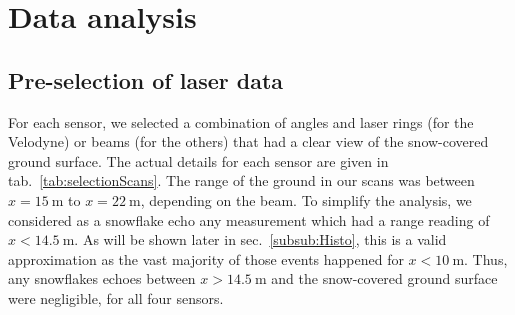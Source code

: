 \section{Data analysis}
\label{sec:data-analysis}



\subsection{Pre-selection of laser data}
For each sensor, we selected a combination of angles and laser rings (for the Velodyne) or beams (for the others) that had a clear view of the snow-covered ground surface. The actual details for each sensor are given in tab.~\ref{tab:selectionScans}. The range of the ground in our scans was between $x = \SI{15}{\meter}$ to $x=\SI{22}{\meter}$, depending on the beam. To simplify the analysis, we considered as a snowflake echo any measurement which had a range reading of $x<\SI{14.5}{\meter}$. As will be shown later in sec.~\ref{subsub:Histo}, this is a valid approximation as the vast majority of those events happened for $x<\SI{10}{\meter}$. Thus, any snowflakes echoes between $x>\SI{14.5}{\meter}$ and the snow-covered ground surface were negligible, for all four sensors.


